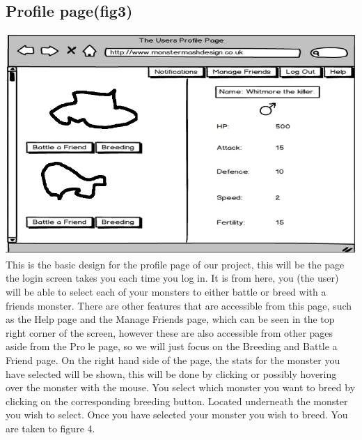 \documentclass{project}
\begin{document}
\subsection{Profile page(fig3)}
\includegraphics[scale=0.5]{userProfile.jpg}\\
This is the basic design for the profile page of our project, this will be the page
the login screen takes you each time you log in. It is from here, you (the user)
will be able to select each of your monsters to either battle or breed with a friends
monster. There are other features that are accessible from this page, such as the
Help page and the Manage Friends page, which can be seen in the top right corner of
the screen, however these are also accessible from other pages aside from the Prole
page, so we will just focus on the Breeding and Battle a Friend page.
On the right hand side of the page, the stats for the monster you have selected
will be shown, this will be done by clicking or possibly hovering over the monster
with the mouse.
You select which monster you want to breed by clicking on the corresponding
breeding button. Located underneath the monster you wish to select. Once you
have selected your monster you wish to breed. You are taken to figure 4.
\end{document}
